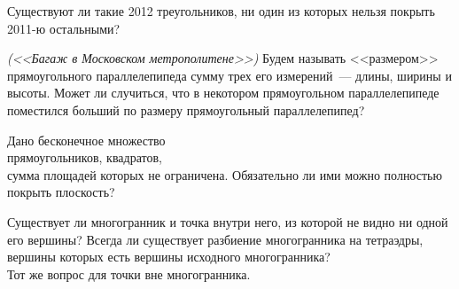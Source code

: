 \begin{problems}
\item
Существуют ли такие 2012 треугольников, ни один из которых нельзя покрыть
2011-ю остальными?


\item\emph{(<<Багаж в Московском метрополитене>>)}
Будем называть <<размером>> прямоугольного параллелепипеда сумму трех его
измерений~--- длины, ширины и высоты.
Может ли случиться, что в некотором прямоугольном параллелепипеде поместился
больший по размеру прямоугольный параллелепипед?

\item
Дано бесконечное множество
\\
\subproblem прямоугольников,
\quad
\subproblem квадратов,
\\
сумма площадей которых не ограничена.
Обязательно ли ими можно полностью покрыть плоскость?

\item
\subproblem
Существует ли многогранник и точка внутри него, из которой не видно ни одной
его вершины?
Всегда ли существует разбиение многогранника на тетраэдры, вершины которых есть
вершины исходного многогранника?
\\
\subproblem
Тот же вопрос для точки вне многогранника.

\end{problems}

